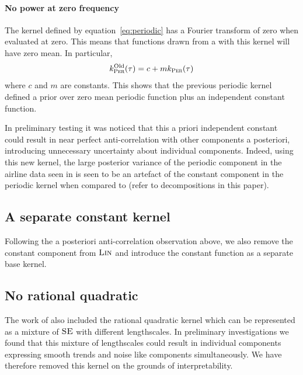 \documentclass{article}
\begin{document}
\paragraph{No power at zero frequency}

The kernel defined by equation~\eqref{eq:periodic} has a Fourier transform of zero when evaluated at zero.
This means that functions drawn from a \gp{} with this kernel will have zero mean.
In particular,
\begin{equation}
k^\textrm{Old}_{\textsc{Per}}(\tau) = c + mk_{\textsc{Per}}(\tau)
\end{equation}
where $c$ and $m$ are constants.
This shows that the previous periodic kernel defined a prior over zero mean periodic function plus an independent constant function.

In preliminary testing it was noticed that this a priori independent constant could result in near perfect anti-correlation with other components a posteriori, introducing unnecessary uncertainty about individual components.
Indeed, using this new kernel, the large posterior variance of the periodic component in the airline data seen in \cite{DuvLloGroetal13} is seen to be an artefact of the constant component in the periodic kernel when compared to (refer to decompositions in this paper).


\subsection{A separate constant kernel}

Following the a posteriori anti-correlation observation above, we also remove the constant component from ${\textsc{Lin}}$ and introduce the constant function as a separate base kernel.

\subsection{No rational quadratic}

The work of \cite{DuvLloGroetal13} also included the rational quadratic kernel which can be represented as a mixture of ${\textsc{SE}}$ with different lengthscales.
In preliminary investigations we found that this mixture of lengthscales could result in individual components expressing smooth trends and noise like components simultaneously.
We have therefore removed this kernel on the grounds of interpretability.
\end{document}
